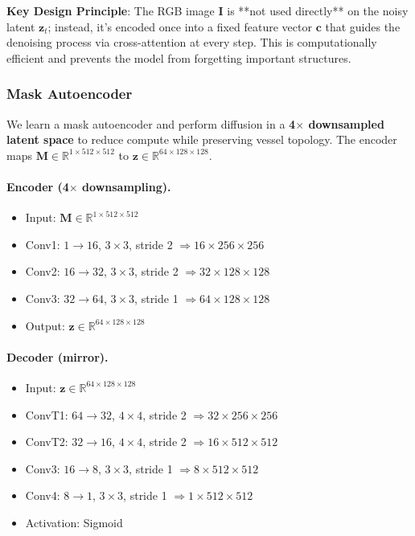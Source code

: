 \documentclass[11pt]{article}
\begin{document}
\textbf{Key Design Principle}: The RGB image $\mathbf{I}$ is **not used directly** on the noisy latent $\mathbf{z}_t$; instead, it's encoded once into a fixed feature vector $\mathbf{c}$ that guides the denoising process via cross-attention at every step. This is computationally efficient and prevents the model from forgetting important structures.

\subsubsection{Mask Autoencoder}


We learn a mask autoencoder and perform diffusion in a \textbf{4$\times$ downsampled latent space} to reduce compute while preserving vessel topology. The encoder maps
$\mathbf{M}\in\mathbb{R}^{1\times512\times512}$ to
$\mathbf{z}\in\mathbb{R}^{64\times128\times128}$.

\paragraph{Encoder (4$\times$ downsampling).}
\begin{itemize}
    \item Input: $\mathbf{M} \in \mathbb{R}^{1 \times 512 \times 512}$
    \item Conv1: $1 \to 16$, $3\times3$, stride 2 $\Rightarrow 16 \times 256 \times 256$
    \item Conv2: $16 \to 32$, $3\times3$, stride 2 $\Rightarrow 32 \times 128 \times 128$
    \item Conv3: $32 \to 64$, $3\times3$, stride 1 $\Rightarrow 64 \times 128 \times 128$
    \item Output: $\mathbf{z}\in\mathbb{R}^{64\times128\times128}$
\end{itemize}

\paragraph{Decoder (mirror).}
\begin{itemize}
    \item Input: $\mathbf{z} \in \mathbb{R}^{64 \times 128 \times 128}$
    \item ConvT1: $64 \to 32$, $4\times4$, stride 2 $\Rightarrow 32 \times 256 \times 256$
    \item ConvT2: $32 \to 16$, $4\times4$, stride 2 $\Rightarrow 16 \times 512 \times 512$
    \item Conv3: $16 \to 8$, $3\times3$, stride 1 $\Rightarrow 8 \times 512 \times 512$
    \item Conv4: $8 \to 1$, $3\times3$, stride 1 $\Rightarrow 1 \times 512 \times 512$
    \item Activation: Sigmoid
\end{itemize}
\end{document}
